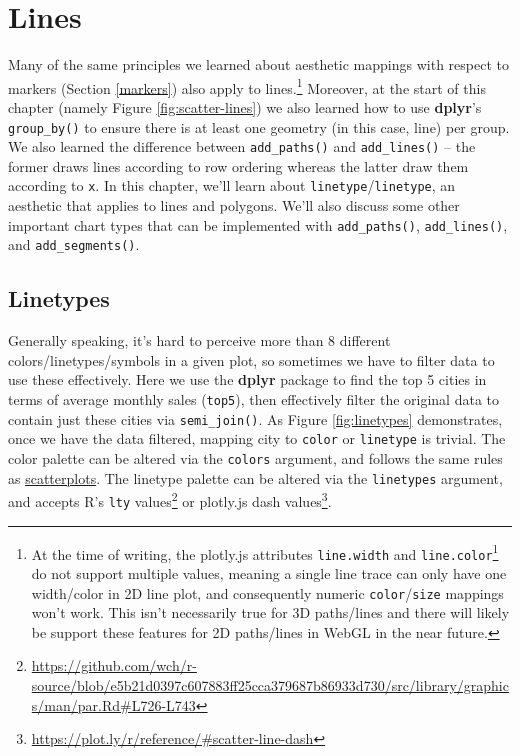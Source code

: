 \documentclass[
  12pt,
]{krantz}
\renewcommand{\href}[2]{#2\footnote{\url{#1}}}
\begin{document}
\hypertarget{lines}{%
\section{Lines}\label{lines}}


Many of the same principles we learned about aesthetic mappings with respect to markers (Section \ref{markers}) also apply to lines.\footnote{At the time of writing, the plotly.js attributes \href{https://github.com/plotly/plotly.js/issues/147}{\texttt{line.width} and \texttt{line.color}} do not support multiple values, meaning a single line trace can only have one width/color in 2D line plot, and consequently numeric \texttt{color}/\texttt{size} mappings won't work. This isn't necessarily true for 3D paths/lines and there will likely be support these features for 2D paths/lines in WebGL in the near future.} Moreover, at the start of this chapter (namely Figure \ref{fig:scatter-lines}) we also learned how to use \textbf{dplyr}'s \texttt{group\_by()} to ensure there is at least one geometry (in this case, line) per group. We also learned the difference between \texttt{add\_paths()} and \texttt{add\_lines()} -- the former draws lines according to row ordering whereas the latter draw them according to \texttt{x}. In this chapter, we'll learn about \texttt{linetype}/\texttt{linetype}, an aesthetic that applies to lines and polygons. We'll also discuss some other important chart types that can be implemented with \texttt{add\_paths()}, \texttt{add\_lines()}, and \texttt{add\_segments()}.

\hypertarget{linetypes}{%
\subsection{Linetypes}\label{linetypes}}


Generally speaking, it's hard to perceive more than 8 different colors/linetypes/symbols in a given plot, so sometimes we have to filter data to use these effectively. Here we use the \textbf{dplyr} package to find the top 5 cities in terms of average monthly sales (\texttt{top5}), then effectively filter the original data to contain just these cities via \texttt{semi\_join()}. As Figure \ref{fig:linetypes} demonstrates, once we have the data filtered, mapping city to \texttt{color} or \texttt{linetype} is trivial. The color palette can be altered via the \texttt{colors} argument, and follows the same rules as \protect\hyperlink{scatterplots}{scatterplots}. The linetype palette can be altered via the \texttt{linetypes} argument, and accepts R's \href{https://github.com/wch/r-source/blob/e5b21d0397c607883ff25cca379687b86933d730/src/library/graphics/man/par.Rd\#L726-L743}{\texttt{lty} values} or plotly.js \href{https://plot.ly/r/reference/\#scatter-line-dash}{dash values}.
\end{document}
